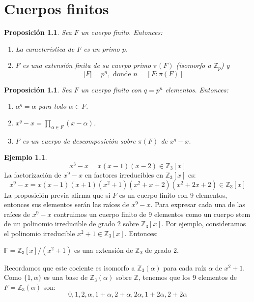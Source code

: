\documentclass{report}
\newtheorem{proposition}[theorem]{Proposición}
\theoremstyle{remark}
\theoremstyle{definition}
\theoremstyle{definition}
\theoremstyle{definition}
\newtheorem*{example}{Ejemplo}
\begin{document}
\chapter{Cuerpos finitos}

\begin{proposition}
    Sea $F$ un cuerpo finito. Entonces:
    \begin{enumerate}
        \item La característica de $F$ es un primo $p$.
        \item $F$ es una extensión finita de su cuerpo primo $\pi(F)$ (isomorfo a $\mathbb{Z}_p$) y $$|F| = p^n, \text{ donde } n = [F : \pi(F)]$$
    \end{enumerate}
\end{proposition}

\begin{proposition}
    Sea $F$ un cuerpo finito con $q = p^n$ elementos. Entonces:
    \begin{enumerate}
        \item $\alpha^q = \alpha$ para todo $\alpha \in F$.
        \item $x^q - x = \prod_{\alpha \in F} (x-\alpha)$.
        \item $F$ es un cuerpo de descomposición sobre $\pi(F)$ de $x^q - x$.
    \end{enumerate}
\end{proposition}

\begin{example}
    $$x^3-x = x(x-1)(x-2) \in \mathbb{Z}_3[x]$$
    La factorización de $x^9-x$ en factores irreducibles en $\mathbb{Z}_3[x]$ es:
    $$x^9-x = x(x-1)(x+1)(x^2+1)(x^2+x+2)(x^2+2x+2) \in \mathbb{Z}_3[x]$$
    La proposición previa afirma que si $F$ es un cuerpo finito con 9 elementos, entonces sus elementos serán las raíces de $x^9-x$.
    Para expresar  cada una de las raíces de $x^9-x$ contruimos un cuerpo finito de 9 elementos como un cuerpo stem de un polinomio irreducible de grado 2 sobre $\mathbb{Z}_3[x]$.
    Por ejemplo, consideramos el polinomio irreducible $x^2+1 \in \mathbb{Z}_3[x]$. Entonces:
    \begin{center}
        $\mathbb{F} = \mathbb{Z}_3[x]/(x^2+1)$ es una extensión de $\mathbb{Z_3}$ de grado 2.
    \end{center}
    Recordamos que este cociente es isomorfo a $\mathbb{Z}_3(\alpha)$ para cada raíz $\alpha$ de $x^2+1$.
    Como $\{ 1, \alpha \}$ es una base de $\mathbb{Z}_3(\alpha)$ sobre $\mathbb{Z}$, tenemos que los 9 elementos de $F = \mathbb{Z}_3(\alpha)$ son:
    $$0, 1, 2, \alpha, 1+\alpha, 2+\alpha, 2\alpha, 1+2\alpha, 2+2\alpha$$
\end{example}
\end{document}
